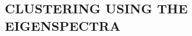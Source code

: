 \documentclass[letterpaper]{article} %
\begin{document}
\subsection{CLUSTERING USING THE EIGENSPECTRA}
\end{document}
